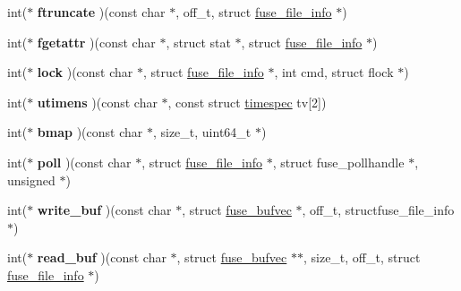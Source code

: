 \begin{DoxyCompactItemize}
\item 
int($\ast$ {\bfseries ftruncate} )(const char $\ast$, off\+\_\+t, struct \hyperlink{structfuse__file__info}{fuse\+\_\+file\+\_\+info} $\ast$)\hypertarget{structfuse__operations_a9bc20fac15d539ebc12ea8892ad563aa}{}\label{structfuse__operations_a9bc20fac15d539ebc12ea8892ad563aa}

\item 
int($\ast$ {\bfseries fgetattr} )(const char $\ast$, struct stat $\ast$, struct \hyperlink{structfuse__file__info}{fuse\+\_\+file\+\_\+info} $\ast$)\hypertarget{structfuse__operations_ab10c7af9faf94092929d63868fff348c}{}\label{structfuse__operations_ab10c7af9faf94092929d63868fff348c}

\item 
int($\ast$ {\bfseries lock} )(const char $\ast$, struct \hyperlink{structfuse__file__info}{fuse\+\_\+file\+\_\+info} $\ast$, int cmd, struct flock $\ast$)\hypertarget{structfuse__operations_a50875b0793d46b25e30cea61b2eb7a3b}{}\label{structfuse__operations_a50875b0793d46b25e30cea61b2eb7a3b}

\item 
int($\ast$ {\bfseries utimens} )(const char $\ast$, const struct \hyperlink{structtimespec}{timespec} tv\mbox{[}2\mbox{]})\hypertarget{structfuse__operations_adaae920bd72edddc5f9494c14ae7eecc}{}\label{structfuse__operations_adaae920bd72edddc5f9494c14ae7eecc}

\item 
int($\ast$ {\bfseries bmap} )(const char $\ast$, size\+\_\+t, uint64\+\_\+t $\ast$)\hypertarget{structfuse__operations_a24c2c62c2b55ad35feb7b2745b3306b3}{}\label{structfuse__operations_a24c2c62c2b55ad35feb7b2745b3306b3}

\item 
int($\ast$ {\bfseries poll} )(const char $\ast$, struct \hyperlink{structfuse__file__info}{fuse\+\_\+file\+\_\+info} $\ast$, struct fuse\+\_\+pollhandle $\ast$, unsigned $\ast$)\hypertarget{structfuse__operations_a883993af81d7cfa1e39fd2e9f7185520}{}\label{structfuse__operations_a883993af81d7cfa1e39fd2e9f7185520}

\item 
int($\ast$ {\bfseries write\+\_\+buf} )(const char $\ast$, struct \hyperlink{structfuse__bufvec}{fuse\+\_\+bufvec} $\ast$, off\+\_\+t, structfuse\+\_\+file\+\_\+info $\ast$)\hypertarget{structfuse__operations_a97885456c4c1a625929df4b6cb8cb193}{}\label{structfuse__operations_a97885456c4c1a625929df4b6cb8cb193}

\item 
int($\ast$ {\bfseries read\+\_\+buf} )(const char $\ast$, struct \hyperlink{structfuse__bufvec}{fuse\+\_\+bufvec} $\ast$$\ast$, size\+\_\+t, off\+\_\+t, struct \hyperlink{structfuse__file__info}{fuse\+\_\+file\+\_\+info} $\ast$)\hypertarget{structfuse__operations_a0d0ac4480af64250a9c76b83ca964440}{}\label{structfuse__operations_a0d0ac4480af64250a9c76b83ca964440}


\end{DoxyCompactItemize}
